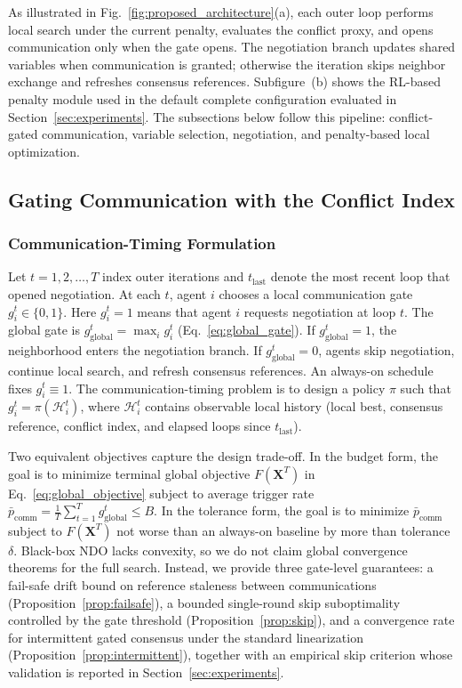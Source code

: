 \documentclass[conference]{IEEEtran}
\begin{document}
As illustrated in Fig.~\ref{fig:proposed_architecture}(a), each outer loop performs local search under the current penalty, evaluates the conflict proxy, and opens communication only when the gate opens. The negotiation branch updates shared variables when communication is granted; otherwise the iteration skips neighbor exchange and refreshes consensus references. Subfigure~(b) shows the RL-based penalty module used in the default complete configuration evaluated in Section~\ref{sec:experiments}. The subsections below follow this pipeline: conflict-gated communication, variable selection, negotiation, and penalty-based local optimization.

\subsection{Gating Communication with the Conflict Index}\label{sec:gate_design}
\subsubsection{Communication-Timing Formulation}\label{sec:timing_problem}
Let $t=1,2,\ldots,T$ index outer iterations and $t_{\mathrm{last}}$ denote the most recent loop that opened negotiation. At each $t$, agent $i$ chooses a local communication gate $g_i^t\in\{0,1\}$. Here $g_i^t=1$ means that agent $i$ requests negotiation at loop $t$. The global gate is $g_{\mathrm{global}}^t=\max_i g_i^t$ (Eq.~\eqref{eq:global_gate}). If $g_{\mathrm{global}}^t=1$, the neighborhood enters the negotiation branch. If $g_{\mathrm{global}}^t=0$, agents skip negotiation, continue local search, and refresh consensus references. An always-on schedule fixes $g_i^t\equiv 1$. The communication-timing problem is to design a policy $\pi$ such that $g_i^t=\pi(\mathcal{H}_i^t)$, where $\mathcal{H}_i^t$ contains observable local history (local best, consensus reference, conflict index, and elapsed loops since $t_{\mathrm{last}}$).

Two equivalent objectives capture the design trade-off. In the budget form, the goal is to minimize terminal global objective $F(\mathbf{X}^T)$ in Eq.~\eqref{eq:global_objective} subject to average trigger rate $\bar p_{\mathrm{comm}}=\frac{1}{T}\sum_{t=1}^T g_{\mathrm{global}}^t \le B$. In the tolerance form, the goal is to minimize $\bar p_{\mathrm{comm}}$ subject to $F(\mathbf{X}^T)$ not worse than an always-on baseline by more than tolerance $\delta$. Black-box NDO lacks convexity, so we do not claim global convergence theorems for the full search. Instead, we provide three gate-level guarantees: a fail-safe drift bound on reference staleness between communications (Proposition~\ref{prop:failsafe}), a bounded single-round skip suboptimality controlled by the gate threshold (Proposition~\ref{prop:skip}), and a convergence rate for intermittent gated consensus under the standard linearization (Proposition~\ref{prop:intermittent}), together with an empirical skip criterion whose validation is reported in Section~\ref{sec:experiments}.
\end{document}
